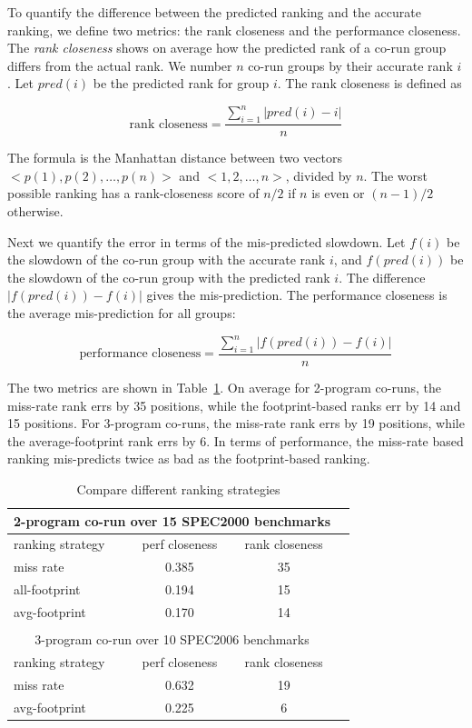 To quantify the difference between the predicted ranking and the
accurate ranking, we define two metrics: the rank closeness and the
performance closeness.  The \emph{rank closeness} shows on average how
the predicted rank of a co-run group differs from the actual rank.
We number $n$ co-run groups by their accurate rank $i$.  Let $pred(i)$
be the predicted rank for group $i$.  The rank closeness is defined as

$$\text{rank closeness} = \frac{\sum_{i=1}^n | pred(i) - i |}{n}$$ 

\noindent The formula is the Manhattan distance between two vectors
$<p(1), p(2), \dots, p(n)>$ and $<1,2,\dots,n>$, divided by $n$.
The worst possible ranking has a rank-closeness score of $n/2$ if $n$
is even or $(n-1)/2$ otherwise.


Next we quantify the error in terms of the mis-predicted
slowdown.  Let $f(i)$ be the slowdown of the co-run group with the
accurate rank $i$, and $f(pred(i))$ be the slowdown of the co-run group
with the predicted rank $i$.  The difference $|f(pred(i)) - f(i)|$
gives the mis-prediction. The performance closeness is the average
mis-prediction for all groups:

$$\text{performance closeness} = \frac{\sum_{i=1}^n | f(pred(i)) - f(i)|}{n}$$ 

The two metrics are shown in Table~\ref{tbl:compare-dis}.  On average
for 2-program co-runs, the miss-rate rank errs by 35 positions, while
the footprint-based ranks err by 14 and 15 positions.  For 3-program
co-runs, the miss-rate rank errs by 19 positions, while the
average-footprint rank errs by 6.  In terms of performance, the
miss-rate based ranking mis-predicts twice as bad as the
footprint-based ranking. 

\begin{table}[h]
\centering
\begin{tabular}{|l|c|c|c|}
\multicolumn{3}{c}{2-program co-run over 15 SPEC2000 benchmarks}\\ \hline
ranking strategy       & perf closeness   & rank closeness   \\ \hline \hline
miss rate   & 0.385     & 35       \\ \hline
all-footprint   & 0.194    & 15    \\ \hline
avg-footprint  & 0.170     & 14    \\ \hline
\multicolumn{3}{c}{}\\
\multicolumn{3}{c}{3-program co-run over 10 SPEC2006 benchmarks}\\ \hline
ranking strategy       & perf closeness   & rank closeness  \\ \hline \hline
miss rate   & 0.632     & 19     \\ \hline
avg-footprint  & 0.225     & 6  \\ \hline 

\end{tabular}
\caption{Compare different ranking strategies}
\label{tbl:compare-dis}
\end{table}

